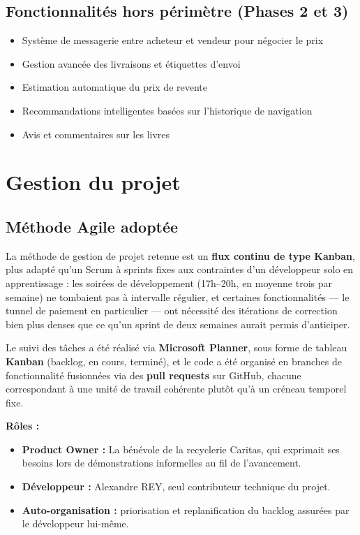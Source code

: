 \documentclass[12pt, a4paper]{report}
\renewcommand{\_}{\origunderscore\allowbreak}
\begin{document}
\subsection{Fonctionnalités hors périmètre (Phases 2 et 3)}

\begin{itemize}
    \item Système de messagerie entre acheteur et vendeur pour négocier le prix
    \item Gestion avancée des livraisons et étiquettes d'envoi
    \item Estimation automatique du prix de revente
    \item Recommandations intelligentes basées sur l'historique de navigation
    \item Avis et commentaires sur les livres
\end{itemize}

\section{Gestion du projet}

\subsection{Méthode Agile adoptée}

La méthode de gestion de projet retenue est un \textbf{flux continu de type Kanban}, plus adapté qu'un Scrum à sprints fixes aux contraintes d'un développeur solo en apprentissage : les soirées de développement (17h–20h, en moyenne trois par semaine) ne tombaient pas à intervalle régulier, et certaines fonctionnalités — le tunnel de paiement en particulier — ont nécessité des itérations de correction bien plus denses que ce qu'un sprint de deux semaines aurait permis d'anticiper.

Le suivi des tâches a été réalisé via \textbf{Microsoft Planner}, sous forme de tableau \textbf{Kanban} (backlog, en cours, terminé), et le code a été organisé en branches de fonctionnalité fusionnées via des \textbf{pull requests} sur GitHub, chacune correspondant à une unité de travail cohérente plutôt qu'à un créneau temporel fixe.

\vspace{8pt}
\noindent\textbf{Rôles :}
\begin{itemize}
    \item \textbf{Product Owner :} La bénévole de la recyclerie Caritas, qui exprimait ses besoins lors de démonstrations informelles au fil de l'avancement.
    \item \textbf{Développeur :} Alexandre REY, seul contributeur technique du projet.
    \item \textbf{Auto-organisation :} priorisation et replanification du backlog assurées par le développeur lui-même.
\end{itemize}
\end{document}
